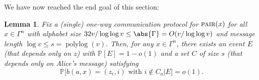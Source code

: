\documentclass[10pt,a4paper]{article}
\newtheorem{lemma}[theorem]{Lemma}
\theoremstyle{definition}
\renewcommand{\P}{\mathbb P}
\newcommand{\polylog}{\operatorname{polylog}}
\newcommand{\pair}{\normalfont\textsc{pair}\xspace}
\newcommand{\vcommitlength}{v}
\newcommand{\vcommitstring}{z}
\newcommand{\alphabet}{\Gamma}
\begin{document}
We have now reached the end goal of this section:
\begin{lemma}
    \label{lem:pair-x-bound}
     Fix a (single) one-way communication protocol for $\pair(x)$ for all $x \in \alphabet^n$ with alphabet size $32 \vcommitlength / \log\log \vcommitlength \leq \abs{\alphabet} = O(\vcommitlength / \log\log \vcommitlength)$ and message length $\log \vcommitlength \leq s = \polylog(\vcommitlength)$. Then, for any $x \in \alphabet^n$, there exists an event $E$ (that depends only on $\vcommitstring$) with $\P[E] = 1 - o(1)$ and a set $C$ of size $s$ (that depends only on Alice's message) satisfying
    \begin{equation*}
        \P\big[b(a,x) = (\vcommitstring_i,i) \text{ with } i \notin C_a \big| E \big] = o(1).
    \end{equation*}
\end{lemma}
\end{document}
